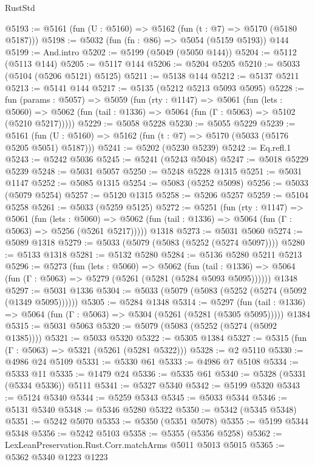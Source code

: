 \begin{lexlean}{RustStd}
\begin{coremodule}
{\begin{coremodule}
{{{{{{{{{{{{{{{{{{{{{{{{{{{{{{{{{{@5193 := @5161 (fun (U : @5160) => @5162 (fun (t : @7) => @5170 (@5180 @5187)))
@5198 := @5032 (fun (fn : @86) => @5054 (@5159 @5193)) @144
@5199 := And.intro
@5202 := @5199 (@5049 (@5050 @144))
@5204 := @5112 (@5113 @144)
@5205 := @5117 @144
@5206 := @5204 @5205
@5210 := @5033 (@5104 (@5206 @5121) @5125)
@5211 := @5138 @144
@5212 := @5137 @5211
@5213 := @5141 @144
@5217 := @5135 (@5212 @5213 @5093 @5095)
@5228 := fun (params : @5057) =>
  @5059
    (fun (rty : @1147) =>
    @5061
      (fun (lets : @5060) =>
      @5062 (fun (tail : @1336) => @5064 (fun (Γ : @5063) => @5102 (@5210 @5217)))))
@5229 := @5058 @5228
@5230 := @5055 @5229
@5239 := @5161 (fun (U : @5160) => @5162 (fun (t : @7) => @5170 (@5033 (@5176 @5205 @5051) @5187)))
@5241 := @5202 (@5230 @5239)
@5242 := Eq.refl.{1}
@5243 := @5242 @5036
@5245 := @5241 (@5243 @5048)
@5247 := @5018 @5229 @5239
@5248 := @5031 @5057
@5250 := @5248 @5228 @1315
@5251 := @5031 @1147
@5252 := @5085 @1315
@5254 := @5083 (@5252 @5098)
@5256 := @5033 (@5079 @5254)
@5257 := @5120 @1315
@5258 := @5206 @5257
@5259 := @5104 @5258
@5261 := @5033 (@5259 @5125)
@5272 := @5251
    (fun (rty : @1147) =>
    @5061
      (fun (lets : @5060) =>
      @5062 (fun (tail : @1336) => @5064 (fun (Γ : @5063) => @5256 (@5261 @5217)))))
    @1318
@5273 := @5031 @5060
@5274 := @5089 @1318
@5279 := @5033 (@5079 (@5083 (@5252 (@5274 @5097))))
@5280 := @5133 @1318
@5281 := @5132 @5280
@5284 := @5136 @5280 @5211 @5213
@5296 := @5273
    (fun (lets : @5060) =>
    @5062
      (fun (tail : @1336) => @5064 (fun (Γ : @5063) => @5279 (@5261 (@5281 (@5284 @5093 @5095))))))
    @1348
@5297 := @5031 @1336
@5304 := @5033 (@5079 (@5083 (@5252 (@5274 (@5092 (@1349 @5095))))))
@5305 := @5284 @1348
@5314 := @5297
    (fun (tail : @1336) => @5064 (fun (Γ : @5063) => @5304 (@5261 (@5281 (@5305 @5095)))))
    @1384
@5315 := @5031 @5063
@5320 := @5079 (@5083 (@5252 (@5274 (@5092 @1385))))
@5321 := @5033 @5320
@5322 := @5305 @1384
@5327 := @5315 (fun (Γ : @5063) => @5321 (@5261 (@5281 @5322)))
@5328 := @2 @5110
@5330 := @4986 @24 @5109
@5331 := @5330 @61
@5333 := @4986 @7 @5108
@5334 := @5333 @11
@5335 := @1479 @24
@5336 := @5335 @61
@5340 := @5328 (@5331 (@5334 @5336)) @5111
@5341 := @5327 @5340
@5342 := @5199 @5320
@5343 := @5124 @5340
@5344 := @5259 @5343
@5345 := @5033 @5344
@5346 := @5131 @5340
@5348 := @5346 @5280 @5322
@5350 := @5342 (@5345 @5348)
@5351 := @5242 @5070
@5353 := @5350 (@5351 @5078)
@5355 := @5199 @5344 @5348
@5356 := @5242 @5103
@5358 := @5355 (@5356 @5258)
@5362 := LexLeanPreservation.Rust.Corr.matchArms @5011 @5013 @5015
@5365 := @5362 @5340 @1223 @1223
}}}}}}}}}}}}}}}}}}}}}}}}}}}}}}}}}}
\end{coremodule}}
\end{coremodule}
\end{lexlean}
